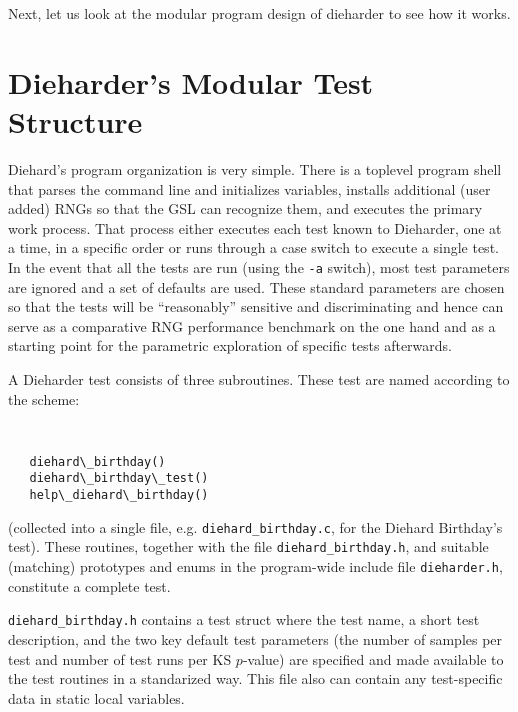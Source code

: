 \documentclass[12pt]{article}
\begin{document}
Next, let us look at the modular program design of dieharder to see how
it works.

\section{Dieharder's Modular Test Structure}

Diehard's program organization is very simple.  There is a toplevel
program shell that parses the command line and initializes variables,
installs additional (user added) RNGs so that the GSL can recognize
them, and executes the primary work process.  That process either
executes each test known to Dieharder, one at a time, in a specific
order or runs through a case switch to execute a single test.  In the
event that all the tests are run (using the {\tt -a} switch), most test
parameters are ignored and a set of defaults are used.  These standard
parameters are chosen so that the tests will be ``reasonably'' sensitive
and discriminating and hence can serve as a comparative RNG performance
benchmark on the one hand and as a starting point for the parametric
exploration of specific tests afterwards.

A Dieharder test consists of three subroutines.  These test are named
according to the scheme:
{\tt 
\begin{verbatim}
   diehard\_birthday()
   diehard\_birthday\_test()
   help\_diehard\_birthday()
\end{verbatim} 
} 
\noindent (collected into a single file, e.g. {\tt diehard\_birthday.c},
for the Diehard Birthday's test).  These routines, together with the
file {\tt diehard\_birthday.h}, and suitable (matching) prototypes and
enums in the program-wide include file {\tt dieharder.h}, constitute a
complete test.

{\tt diehard\_birthday.h} contains a test struct where the test name, a
short test description, and the two key default test parameters (the
number of samples per test and number of test runs per KS $p$-value) are
specified and made available to the test routines in a standarized way.
This file also can contain any test-specific data in static local
variables.
\end{document}
